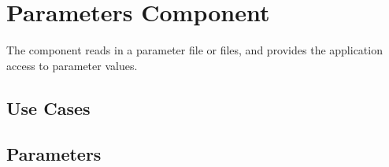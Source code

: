 \section{Parameters Component} \label{s:component-parameters}

The  component reads in a parameter file or files, and
provides the application access to parameter values.

\subsection{Use Cases}
\subsection{Parameters}

